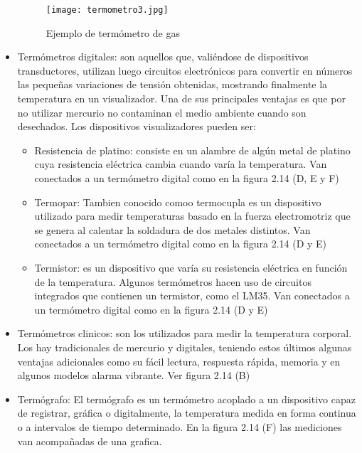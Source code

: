 \begin{itemize}
	\begin{figure}[H]
		\centering
		\texttt{[image: termometro3.jpg]}
		\caption{Ejemplo de termómetro de gas}
	\end{figure}
	
	\item Termómetros digitales: son aquellos que, valiéndose de dispositivos transductores, utilizan luego circuitos electrónicos para convertir en números las pequeñas variaciones de tensión obtenidas, mostrando finalmente la temperatura en un visualizador. Una de sus principales ventajas es que por no utilizar mercurio no contaminan el medio ambiente cuando son desechados. Los dispositivos visualizadores pueden ser:
	
	\begin{itemize}
		
		\item Resistencia de platino: consiste en un alambre de algún metal de platino cuya resistencia eléctrica cambia cuando varía la temperatura. Van conectados a un termómetro digital como en la figura 2.14 (D, E y F)
		
		\item Termopar: Tambien conocido comoo termocupla es un dispositivo utilizado para medir temperaturas basado en la fuerza electromotriz que se genera al calentar la soldadura de dos metales distintos. Van conectados a un termómetro digital como en la figura 2.14 (D y E)
		
		\item Termistor:  es un dispositivo que varía su resistencia eléctrica en función de la temperatura. Algunos termómetros hacen uso de circuitos integrados que contienen un termistor, como el LM35. Van conectados a un termómetro digital como en la figura 2.14 (D y E)
		
	\end{itemize}
	
	\item Termómetros clinicos: son los utilizados para medir la temperatura corporal. Los hay tradicionales de mercurio y digitales, teniendo estos últimos algunas ventajas adicionales como su fácil lectura, respuesta rápida, memoria y en algunos modelos alarma vibrante. Ver figura 2.14 (B)
	
	\item Termógrafo: El termógrafo es un termómetro acoplado a un dispositivo capaz de registrar, gráfica o digitalmente, la temperatura medida en forma continua o a intervalos de tiempo determinado. En la figura 2.14 (F) las mediciones van acompañadas de una grafica.
	
\end{itemize}
